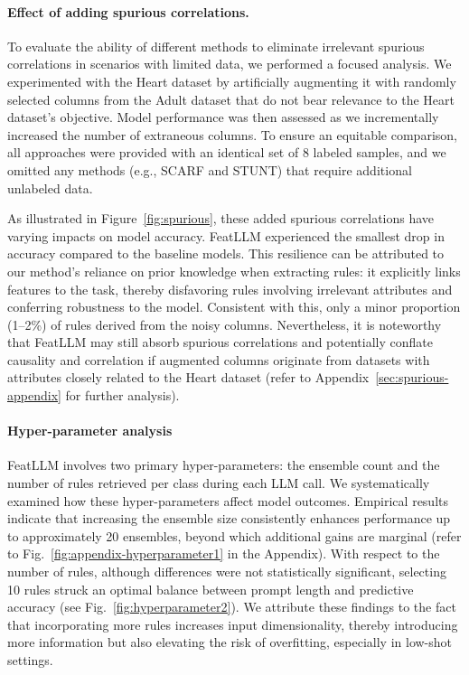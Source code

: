 \vspace*{-0.12in}
\paragraph{Effect of adding spurious correlations.} To evaluate the ability of different methods to eliminate irrelevant spurious correlations in scenarios with limited data, we performed a focused analysis. We experimented with the Heart dataset by artificially augmenting it with randomly selected columns from the Adult dataset that do not bear relevance to the Heart dataset’s objective. Model performance was then assessed as we incrementally increased the number of extraneous columns. To ensure an equitable comparison, all approaches were provided with an identical set of 8 labeled samples, and we omitted any methods (e.g., SCARF and STUNT) that require additional unlabeled data.

As illustrated in Figure~\ref{fig:spurious}, these added spurious correlations have varying impacts on model accuracy. \textsf{FeatLLM} experienced the smallest drop in accuracy compared to the baseline models. This resilience can be attributed to our method’s reliance on prior knowledge when extracting rules: it explicitly links features to the task, thereby disfavoring rules involving irrelevant attributes and conferring robustness to the model. Consistent with this, only a minor proportion (1–2\%) of rules derived from the noisy columns. Nevertheless, it is noteworthy that \textsf{FeatLLM} may still absorb spurious correlations and potentially conflate causality and correlation if augmented columns originate from datasets with attributes closely related to the Heart dataset (refer to Appendix~\ref{sec:spurious-appendix} for further analysis).

\vspace*{-0.12in}
\paragraph{Hyper-parameter analysis}
\textsf{FeatLLM} involves two primary hyper-parameters: the ensemble count and the number of rules retrieved per class during each LLM call. We systematically examined how these hyper-parameters affect model outcomes. Empirical results indicate that increasing the ensemble size consistently enhances performance up to approximately 20 ensembles, beyond which additional gains are marginal (refer to Fig.~\ref{fig:appendix-hyperparameter1} in the Appendix). With respect to the number of rules, although differences were not statistically significant, selecting 10 rules struck an optimal balance between prompt length and predictive accuracy (see Fig.~\ref{fig:hyperparameter2}). We attribute these findings to the fact that incorporating more rules increases input dimensionality, thereby introducing more information but also elevating the risk of overfitting, especially in low-shot settings.

